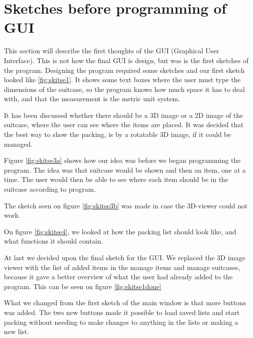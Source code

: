 \section{Sketches before programming of GUI}
This section will describe the first thoughts of the GUI (Graphical User Interface). This is not how the final GUI is design, but was is the first sketches of the program.
Designing the program required some sketches and our first sketch looked like \ref{fig:skitse1}.
It shows some text boxes where the user must type the dimensions of the suitcase, so the program knows how much space it has to deal with, and that the measurement is the metric unit system.


It has been discussed whether there should be a 3D image or a 2D image of the suitcase, where the user can see where the items are placed. It was decided that the best way to show the packing, is by a rotatable 3D image, if it could be managed.

Figure \ref{fig:skitse3a} shows how our idea was before we began programming the program. The idea was that suitcase would be shown and then an item, one at a time. The user would then be able to see where each item should be in the suitcase according to program.


The sketch seen on figure \ref{fig:skitse3b} was made in case the 3D-viewer could not work.

On figure \ref{fig:skitse4}, we looked at how the packing list should look like, and what functions it should contain.


At last we decided upon the final sketch for the GUI. We replaced the 3D image viewer with the list of added items in the manage items and manage suitcases, because it gave a better overview of what the user had already added to the program. This can be seen on figure \ref{fig:skitse1done} 


What we changed from the first sketch of the main window is that more buttons was added. The two new buttons made it possible to load saved lists and start packing without needing to make changes to anything in the lists or making a new list.

